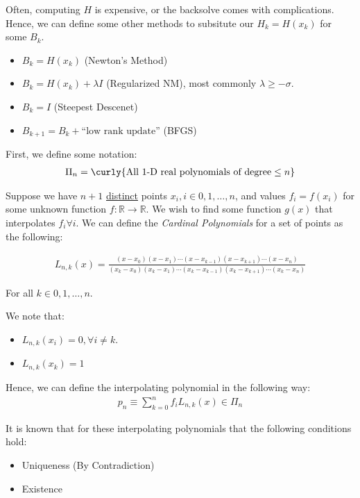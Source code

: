 \documentclass{article}
\newcommand{\R}{\mathbb{R}}
\begin{document}
 Often, computing $H$ is expensive, or the backsolve comes with complications. Hence, we can define some other methods to subsitute our $H_k = H(x_k)$ for some $B_k$.
\begin{itemize}
\item $B_k = H(x_k)$ (Newton's Method)
\item $B_k = H(x_k) + \lambda I$ (Regularized NM), most commonly $\lambda \geq - \sigma$.
\item $B_k = I$ (Steepest Descenet)
  \item $B_{k + 1}= B_k + \text{``low rank update''}$ (BFGS)
\end{itemize}

\pagebreak
{}

 First, we define some notation:
\begin{align*}
  \Pi_n = \curly{\text{All 1-D real polynomials of degree} \leq n}
\end{align*}

 Suppose we have $n+1$ \underline{distinct} points $x_i, i \in 0, 1, \ldots, n$, and values $f_i = f(x_i)$ for some unknown function $f: \R \to \R$. We wish to find some function $g(x)$ that interpolates $f_i \forall i$.
\gap
{} We can define the \textit{Cardinal Polynomials} for a set of points as the following:

\begin{align*}
  L_{n, k} (x) = \frac{(x-x_0) (x-x_1) \cdots (x-x_{k-1})(x-x_{k + 1}) \cdots (x- x_n)}{(x_k-x_0) (x_k-x_1) \cdots (x_k-x_{k-1})(x_k-x_{k + 1}) \cdots (x_k - x_n)}
\end{align*}

For all $k \in 0, 1, \ldots, n$.

We note that:
\begin{itemize}
\item $L_{n,k} (x_i)= 0, \forall i \neq k$.
\item $L_{n, k} (x_k) = 1$
\end{itemize}

Hence, we can define the interpolating polynomial in the following way:
\begin{align*}
  p_n \equiv \sum_{k=0}^{n}f_i L_{n, k} (x) \in \Pi_n
\end{align*}

It is known that for these interpolating polynomials that the following conditions hold:
\begin{itemize}
\item Uniqueness (By Contradiction)
\item Existence
\end{itemize}
\end{document}
